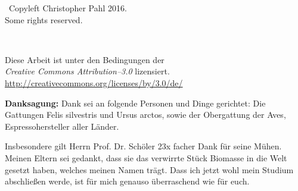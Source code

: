\nopagecolor

\newpage

\thispagestyle{empty}
\vspace*{0in}
\begin{center}
  {\Large{}}\ Copyleft Christopher Pahl 2016. \\
  Some rights reserved. \\
  \vspace{1in}
  \begin{minipage}[c]{0.2\linewidth}
    \hfill {\Huge \ccLogo~\ccAttribution}
  \end{minipage}
  \hspace{0.1cm}
  \begin{minipage}[c]{0.7\linewidth}
    Diese Arbeit ist unter den Bedingungen der \\
    \textit{Creative Commons Attribution--3.0} lizensiert. \\
    \url{http://creativecommons.org/licenses/by/3.0/de/}
  \end{minipage}
\end{center}
\vspace{6cm}
\textbf{Danksagung:} Dank sei an folgende Personen und Dinge gerichtet: Die
Gattungen Felis silvestris und Ursus arctos, sowie der Obergattung der Aves,
Espressohersteller aller Länder.

Insbesondere gilt Herrn Prof. Dr. Schöler 23x facher Dank für seine Mühen.
Meinen Eltern sei gedankt, dass sie das verwirrte Stück Biomasse in die Welt
gesetzt haben, welches meinen Namen trägt. Dass ich jetzt wohl mein Studium
abschließen werde, ist für mich genauso überraschend wie für euch.
\clearpage

\newpage
